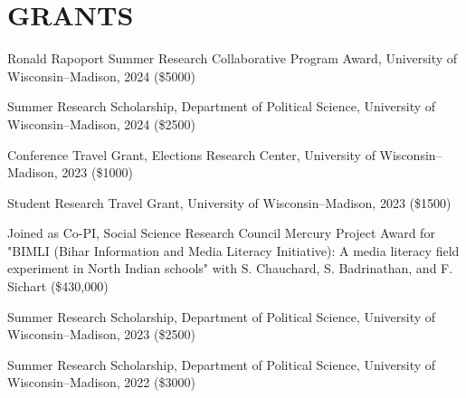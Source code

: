 \documentclass[10pt,letterpaper]{article}
\renewenvironment{itemize}{
  \begin{list}{}{
      \setlength{\leftmargin}{1.5em}
      \setlength{\itemsep}{0.25em}
      \setlength{\parskip}{0pt}
      \setlength{\parsep}{0.25em}
    }
}{
  \end{list}
}
\begin{document}
\section*{GRANTS}
\begin{itemize}
\item Ronald Rapoport Summer Research Collaborative Program Award, University of Wisconsin--Madison, 2024  (\$5000)
\item Summer Research Scholarship, Department of Political Science, University of Wisconsin--Madison, 2024  (\$2500)

\item Conference Travel Grant, Elections Research Center, University of Wisconsin--Madison, 2023  (\$1000)
\item Student Research Travel Grant, University of Wisconsin--Madison, 2023  (\$1500)

\item Joined as Co-PI, Social Science Research Council Mercury Project Award for "BIMLI (Bihar Information and Media Literacy Initiative): A media literacy field experiment in North Indian schools" with S. Chauchard, S. Badrinathan, and F. Sichart  (\$430,000)

\item Summer Research Scholarship, Department of Political Science, University of Wisconsin--Madison, 2023  (\$2500)

\item Summer Research Scholarship, Department of Political Science, University of Wisconsin--Madison, 2022  (\$3000)


\end{itemize}
\end{document}

